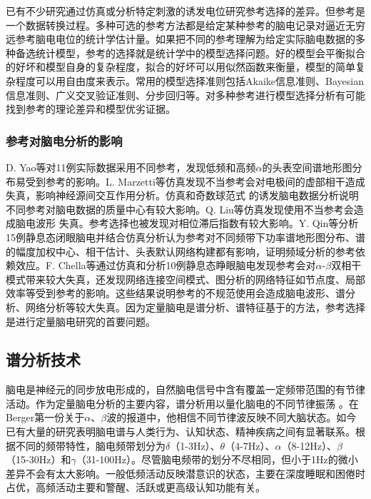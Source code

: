 已有不少研究通过仿真或分析特定刺激的诱发电位研究参考选择的差异。但参考是一个数据转换过程。多种可选的参考方法都是给定某种参考的脑电记录对逼近无穷远参考脑电电位的统计学估计量。如果把不同的参考理解为给定实际脑电数据的多种备选统计模型，参考的选择就是统计学中的模型选择问题。好的模型会平衡拟合的好坏和模型自身的复杂程度，拟合的好坏可以用似然函数来衡量，模型的简单复杂程度可以用自由度来表示。常用的模型选择准则包括Akaike信息准则、Bayesian信息准则、广义交叉验证准则、分步回归等。对多种参考进行模型选择分析有可能找到参考的理论差异和模型优劣证据。

\subsubsection{参考对脑电分析的影响}
D. Yao等对11例实际数据采用不同参考，发现低频和高频$\alpha$的头表空间谱地形图分布易受到参考的影响。L. Marzetti等仿真发现不当参考会对电极间的虚部相干造成失真，影响神经源间交互作用分析。仿真和奇数球范式
的诱发脑电数据分析说明不同参考对脑电数据的质量中心有较大影响。Q. Liu等仿真发现使用不当参考会造成脑电波形
失真。参考选择也被发现对相位滞后指数有较大影响。Y. Qin等分析15例静息态闭眼脑电并结合仿真分析认为参考对不同频带下功率谱地形图分布、谱的幅度加权中心、相干估计、头表默认网络构建都有影响，证明频域分析的参考依赖效应。F. Chella等通过仿真和分析10例静息态睁眼脑电发现参考会对$\alpha$-$\beta$双相干模式带来较大失真，还发现网络连接空间模式、图分析的网络特征如节点度、局部效率等受到参考的影响。这些结果说明参考的不规范使用会造成脑电波形、谱分析、网络分析等较大失真。因为定量脑电是谱分析、谱特征基于的方法，参考选择是进行定量脑电研究的首要问题。

\subsection{谱分析技术}
脑电是神经元的同步放电形成的，自然脑电信号中含有覆盖一定频带范围的有节律活动。作为定量脑电分析的主要内容，谱分析用以量化脑电的不同节律振荡
。在Berger第一份关于$\alpha$、$\beta$波的报道中，他相信不同节律波反映不同大脑状态。如今已有大量的研究表明脑电谱与人类行为、认知状态、精神疾病之间有显著联系。根据不同的频带特性，脑电频带划分为$\delta$（1-3Hz）、$\theta$（4-7Hz）、$\alpha$（8-12Hz）、$\beta$（15-30Hz）和$\gamma$（31-100Hz）。尽管脑电频带的划分不尽相同，但小于1Hz的微小差异不会有太大影响。一般低频活动反映潜意识的状态，主要在深度睡眠和困倦时占优，高频活动主要和警醒、活跃或更高级认知功能有关。

